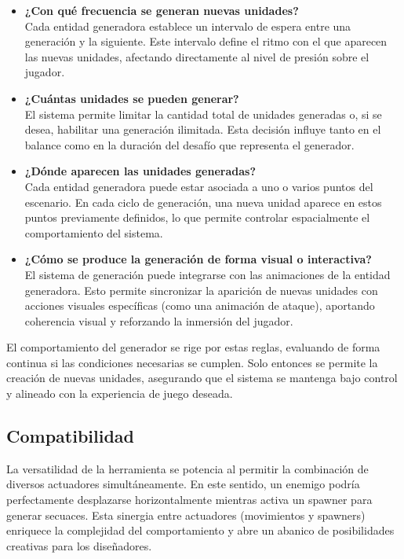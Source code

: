 \begin{itemize}
    \item \textbf{¿Con qué frecuencia se generan nuevas unidades?} \\
    Cada entidad generadora establece un intervalo de espera entre una generación y la siguiente. Este intervalo define el ritmo con el que aparecen las nuevas unidades, afectando directamente al nivel de presión sobre el jugador.

    \item \textbf{¿Cuántas unidades se pueden generar?} \\
    El sistema permite limitar la cantidad total de unidades generadas o, si se desea, habilitar una generación ilimitada. Esta decisión influye tanto en el balance como en la duración del desafío que representa el generador.

    \item \textbf{¿Dónde aparecen las unidades generadas?} \\
    Cada entidad generadora puede estar asociada a uno o varios puntos del escenario. En cada ciclo de generación, una nueva unidad aparece en estos puntos previamente definidos, lo que permite controlar espacialmente el comportamiento del sistema.

    \item \textbf{¿Cómo se produce la generación de forma visual o interactiva?} \\
    El sistema de generación puede integrarse con las animaciones de la entidad generadora. Esto permite sincronizar la aparición de nuevas unidades con acciones visuales específicas (como una animación de ataque), aportando coherencia visual y reforzando la inmersión del jugador.
\end{itemize}

El comportamiento del generador se rige por estas reglas, evaluando de forma continua si las condiciones necesarias se cumplen. Solo entonces se permite la creación de nuevas unidades, asegurando que el sistema se mantenga bajo control y alineado con la experiencia de juego deseada.

\subsection{Compatibilidad}
La versatilidad de la herramienta se potencia al permitir la combinación de diversos actuadores simultáneamente. En este sentido, un enemigo podría perfectamente desplazarse horizontalmente mientras activa un spawner para generar secuaces. Esta sinergia entre actuadores (movimientos y spawners) enriquece la complejidad del comportamiento y abre un abanico de posibilidades creativas para los diseñadores.\\

